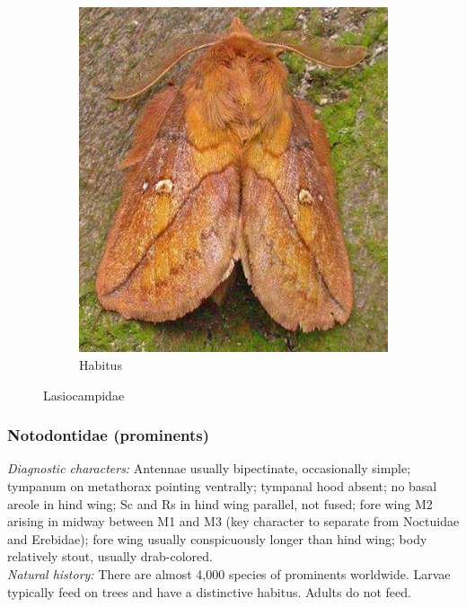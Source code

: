 \documentclass[letterpaper, 11pt]{article}
\begin{document}
\begin{figure}[ht!]
\begin{subfigure}[ht!]{0.31\textwidth}
        \includegraphics[width=\textwidth]{image01}
        \caption{Habitus}
        \label{fig:lasiocampid2}
    \end{subfigure}
    \caption{Lasiocampidae}\label{fig:lasiocampids}
\end{figure}

\subsubsection{Notodontidae (prominents)}
\noindent{}\textit{Diagnostic characters:} Antennae usually bipectinate, occasionally simple; tympanum on metathorax pointing ventrally; tympanal hood absent; no basal areole in hind wing; Sc and Rs in hind wing parallel, not fused; fore wing M2 arising in midway between M1 and M3 (key character to separate from Noctuidae and Erebidae); fore wing usually conspicuously longer than hind wing; body relatively stout, usually drab-colored.\\

\noindent{}\textit{Natural history:} There are almost 4,000 species of prominents worldwide. Larvae typically feed on trees and have a distinctive habitus. Adults do not feed.
\end{document}
